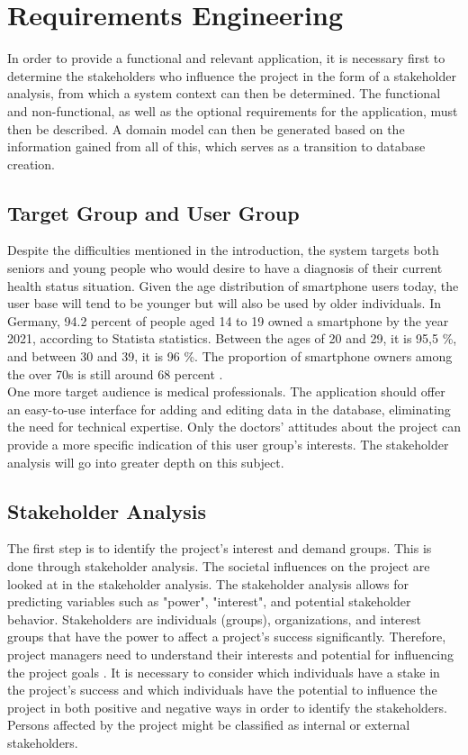 
\chapter{Requirements Engineering}
In order to provide a functional and relevant application, it is necessary first to determine the stakeholders who influence the project in the form of a stakeholder analysis, from which a system context can then be determined. The functional and non-functional, as well as the optional requirements for the application, must then be described. A domain model can then be generated based on the information gained from all of this, which serves as a transition to database creation.

\section{Target Group and User Group}
Despite the difficulties mentioned in the introduction, the system targets both seniors and young people who would desire to have a diagnosis of their current health status situation. Given the age distribution of smartphone users today, the user base will tend to be younger but will also be used by older individuals. In Germany, 94.2 percent of people aged 14 to 19 owned a smartphone by the year 2021, according to Statista statistics. Between the ages of 20 and 29, it is 95,5 \%, and between 30 and 39, it is 96 \%. The proportion of smartphone owners among the over 70s is still around 68 percent \cite{.smartphonenutzer}.
\newline \\
One more target audience is medical professionals. The application should offer an easy-to-use interface for adding and editing data in the database, eliminating the need for technical expertise. Only the doctors' attitudes about the project can provide a more specific indication of this user group's interests. The stakeholder analysis will go into greater depth on this subject. 

\section{Stakeholder Analysis}
The first step is to identify the project's interest and demand groups. This is done through stakeholder analysis. The societal influences on the project are looked at in the stakeholder analysis. The stakeholder analysis allows for predicting variables such as "power", "interest", and potential stakeholder behavior. Stakeholders are individuals (groups), organizations, and interest groups that have the power to affect a project's success significantly. Therefore, project managers need to understand their interests and potential for influencing the project goals \cite[p. 28]{.stakeholder}. It is necessary to consider which individuals have a stake in the project's success and which individuals have the potential to influence the project in both positive and negative ways in order to identify the stakeholders. Persons affected by the project might be classified as internal or external stakeholders. 

